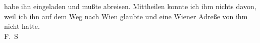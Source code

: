 \pstart
           habe ihn eingeladen und mußte abreisen. Mittheilen konnte ich ihm nichts davon,
                  weil ich ihn auf dem Weg nach Wien glaubte und
                  eine {\pb}Wiener Adreße von ihm nicht hatte. {\\}\spacefill\mbox{F. S}\pend
           \endnumbering{}  \newcommand{\dateiname}{L03338}\newcommand{\titel}{Felix Salten an Arthur Schnitzler, 28. 12. 1902}\newcommand{\editorInnen}{Martin Anton Müller und Laura Untner}
